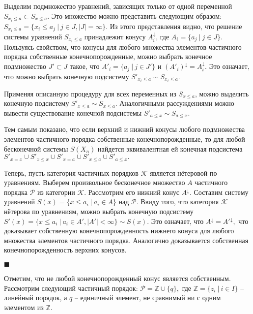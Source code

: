 \documentclass[12pt]{article}
\theoremstyle{break}
\newenvironment{Proof} %
	{\par\noindent{\bf Доказательство.}} %
	{\hfill$\scriptstyle\blacksquare$} %
\def\P{\mathcal{P}}
\begin{document}
\begin{Proof}
			Выделим подмножество уравнений, зависящих только от одной переменной $S_{x_i\leqslant a}\subset S_{x\leqslant a}$. Это множество можно представить следующим образом: $S_{x_i\leqslant a}=\{x_i\leqslant a_j\ |\ j\in J, |J| = \infty\}.$ Из этого представления видно, что решение системы уравнений $S_{x_i\leqslant a}$ принадлежит конусу $A_i^{\downarrow}$, где $A_i = \{a_j\ |\ j\in J\}$. Пользуясь свойством, что конусы для любого множества элементов частичного порядка собственные конечнопорожденные, можно выбрать конечное подмножество $J'\subset J$ такое, что $A'_i = \{a_j\ |\ j\in J'\}$ и $(A'_i)^{\downarrow} = A_i^{\downarrow}.$ Это означает, что можно выбрать конечную подсистему $S'_{x_i\leqslant a}\sim S_{x_i\leqslant a}$.

			Применяя описанную процедуру для всех переменных из $S_{x\leqslant a}$, можно выделить конечную подсистему $S'_{x\leqslant a}\sim S_{x\leqslant a}.$ Аналогичными рассуждениями можно вывести существование конечной подсистемы $S'_{a\leqslant x}\sim S_{a\leqslant x}.$

			Тем самым показано, что если верхний и нижний конусы любого подмножества элементов частичного порядка собственные конечнопорожденные, то для любой бесконечной системы $S(X_n)$ найдется эквивалентная ей конечная подсистема $S'_{x=x}\cup S'_{x\leqslant x}\cup S'_{x=a}\cup S'_{x\leqslant a}\cup S'_{a\leqslant x}.$  

			Теперь, пусть категория частичных порядков $\mathcal{K}$ является нётеровой по уравнениям. Выберем произвольное бесконечное множество $A$ частичного порядка $\P$ из категории $\mathcal{K}.$ Рассмотрим его нижний конус $A^{\downarrow}$. Составим систему уравнений $S(x) = \{x\leqslant a_i\ |\ a_i\in A\}$ над $\P$. Ввиду того, что категория $\mathcal{K}$ нётерова по уравнениям, можно выбрать конечную подсистему $S'(x)=\{x\leqslant a_i\ |\ a_i\in A', |A'|<\infty\}\sim S(x)$. Это означает, что $A^{\downarrow} = A'^{\downarrow},$ что доказывает собственную конечнопорожденность нижнего конуса для любого множества элементов частичного порядка. Аналогично доказывается собственная конечнопорожденность верхних конусов.

		\end{Proof}

		Отметим, что не любой конечнопорожденный конус является собственным. Рассмотрим следующий частичный порядок: $\P = \mathbb{Z}\cup \{q\},$ где $\mathbb{Z} = \{z_i\ |\ i\in I\}$ -- линейный порядок, а $q$ -- единичный элемент, не сравнимый ни с одним элементом из $\mathbb{Z}.$
\end{document}
